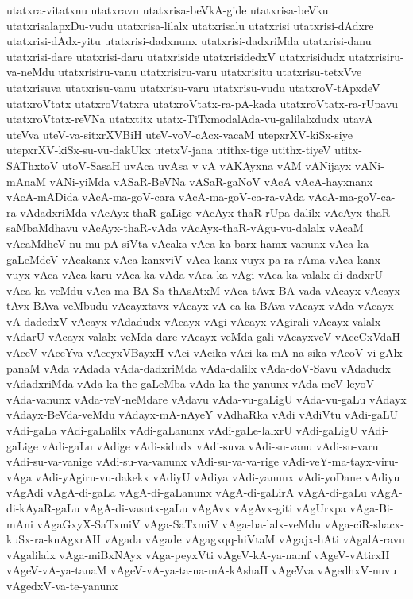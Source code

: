{utatxra-vitatxnu
utatxravu
utatxrisa-beVkA-gide
utatxrisa-beVku
utatxrisalapxDu-vudu
utatxrisa-lilalx
utatxrisalu
utatxrisi
utatxrisi-dAdxre
utatxrisi-dAdx-yitu
utatxrisi-dadxnunx
utatxrisi-dadxriMda
utatxrisi-danu
utatxrisi-dare
utatxrisi-daru
utatxriside
utatxrisidedxV
utatxrisidudx
utatxrisiru-va-neMdu
utatxrisiru-vanu
utatxrisiru-varu
utatxrisitu
utatxrisu-tetxVve
utatxrisuva
utatxrisu-vanu
utatxrisu-varu
utatxrisu-vudu
utatxroV-tApxdeV
utatxroVtatx
utatxroVtatxra
utatxroVtatx-ra-pA-kada
utatxroVtatx-ra-rUpavu
utatxroVtatx-reVNa
utatxtitx
utatx-TiTxmodalAda-vu-galilalxdudx
utavA
uteVva
uteV-va-sitxrXVBiH
uteV-voV-cAcx-vacaM
utepxrXV-kiSx-siye
utepxrXV-kiSx-su-vu-dakUkx
utetxV-jana
utithx-tige
utithx-tiyeV
utitx-SAThxtoV
utoV-SasaH
uvAca
uvAsa
v
vA
vAKAyxna
vAM
vANijayx
vANi-mAnaM
vANi-yiMda
vASaR-BeVNa
vASaR-gaNoV
vAcA
vAcA-hayxnanx
vAcA-mADida
vAcA-ma-goV-cara
vAcA-ma-goV-ca-ra-vAda
vAcA-ma-goV-ca-ra-vAdadxriMda
vAcAyx-thaR-gaLige
vAcAyx-thaR-rUpa-dalilx
vAcAyx-thaR-saMbaMdhavu
vAcAyx-thaR-vAda
vAcAyx-thaR-vAgu-vu-dalalx
vAcaM
vAcaMdheV-nu-mu-pA-siVta
vAcaka
vAca-ka-barx-hamx-vanunx
vAca-ka-gaLeMdeV
vAcakanx
vAca-kanxviV
vAca-kanx-vuyx-pa-ra-rAma
vAca-kanx-vuyx-vAca
vAca-karu
vAca-ka-vAda
vAca-ka-vAgi
vAca-ka-valalx-di-dadxrU
vAca-ka-veMdu
vAca-ma-BA-Sa-thAsAtxM
vAca-tAvx-BA-vada
vAcayx
vAcayx-tAvx-BAva-veMbudu
vAcayxtavx
vAcayx-vA-ca-ka-BAva
vAcayx-vAda
vAcayx-vA-dadedxV
vAcayx-vAdadudx
vAcayx-vAgi
vAcayx-vAgirali
vAcayx-valalx-vAdarU
vAcayx-valalx-veMda-dare
vAcayx-veMda-gali
vAcayxveV
vAceCxVdaH
vAceV
vAceYva
vAceyxVBayxH
vAci
vAcika
vAci-ka-mA-na-sika
vAcoV-vi-gAlx-panaM
vAda
vAdada
vAda-dadxriMda
vAda-dalilx
vAda-doV-Savu
vAdadudx
vAdadxriMda
vAda-ka-the-gaLeMba
vAda-ka-the-yanunx
vAda-meV-leyoV
vAda-vanunx
vAda-veV-neMdare
vAdavu
vAda-vu-gaLigU
vAda-vu-gaLu
vAdayx
vAdayx-BeVda-veMdu
vAdayx-mA-nAyeY
vAdhaRka
vAdi
vAdiVtu
vAdi-gaLU
vAdi-gaLa
vAdi-gaLalilx
vAdi-gaLanunx
vAdi-gaLe-lalxrU
vAdi-gaLigU
vAdi-gaLige
vAdi-gaLu
vAdige
vAdi-sidudx
vAdi-suva
vAdi-su-vanu
vAdi-su-varu
vAdi-su-va-vanige
vAdi-su-va-vanunx
vAdi-su-va-va-rige
vAdi-veY-ma-tayx-viru-vAga
vAdi-yAgiru-vu-dakekx
vAdiyU
vAdiya
vAdi-yanunx
vAdi-yoDane
vAdiyu
vAgAdi
vAgA-di-gaLa
vAgA-di-gaLanunx
vAgA-di-gaLirA
vAgA-di-gaLu
vAgA-di-kAyaR-gaLu
vAgA-di-vasutx-gaLu
vAgAvx
vAgAvx-giti
vAgUrxpa
vAga-Bi-mAni
vAgaGxyX-SaTxmiV
vAga-SaTxmiV
vAga-ba-lalx-veMdu
vAga-ciR-shacx-kuSx-ra-knAgxrAH
vAgada
vAgade
vAgagxqq-hiVtaM
vAgajx-hAti
vAgalA-ravu
vAgalilalx
vAga-miBxNAyx
vAga-peyxVti
vAgeV-kA-ya-namf
vAgeV-vAtirxH
vAgeV-vA-ya-tanaM
vAgeV-vA-ya-ta-na-mA-kAshaH
vAgeVva
vAgedhxV-nuvu
vAgedxV-va-te-yanunx
}
